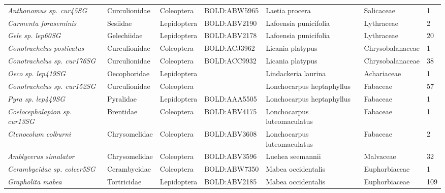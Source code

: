 \documentclass[11pt]{article}
\begin{document}
\begin{landscape}
\begin{longtable}{@{}lllllll@{}}
\textit{Anthonomus sp. cur45SG}                       & Curculionidae   & Coleoptera   & BOLD:ABW5965 & Laetia procera                     & Salicaceae       & 1     \\
\textit{Carmenta foraseminis}                         & Sesiidae        & Lepidoptera  & BOLD:ABV2190 & Lafoensia punicifolia              & Lythraceae       & 2     \\
\textit{Gele sp. lep60SG}                             & Gelechiidae     & Lepidoptera  & BOLD:ABV2178 & Lafoensia punicifolia              & Lythraceae       & 20    \\
\textit{Conotrachelus posticatus}                     & Curculionidae   & Coleoptera   & BOLD:ACJ3962 & Licania platypus                   & Chrysobalanaceae & 1     \\
\textit{Conotrachelus sp. cur176SG}                   & Curculionidae   & Coleoptera   & BOLD:ACC9932 & Licania platypus                   & Chrysobalanaceae & 38    \\
\textit{Oeco sp. lep419SG}                            & Oecophoridae    & Lepidoptera  &              & Lindackeria laurina                & Achariaceae      & 1     \\
\textit{Conotrachelus sp. cur152SG}                   & Curculionidae   & Coleoptera   &              & Lonchocarpus heptaphyllus          & Fabaceae         & 57    \\
\textit{Pyra sp. lep449SG}                            & Pyralidae       & Lepidoptera  & BOLD:AAA5505 & Lonchocarpus heptaphyllus          & Fabaceae         & 1     \\
\textit{Coelocephalapion sp. cur13SG}                 & Brentidae       & Coleoptera   & BOLD:ABV4175 & Lonchocarpus luteomaculatus        & Fabaceae         & 1     \\
\textit{Ctenocolum colburni}                          & Chrysomelidae   & Coleoptera   & BOLD:ABV3608 & Lonchocarpus luteomaculatus        & Fabaceae         & 2     \\
\textit{Amblycerus simulator}                         & Chrysomelidae   & Coleoptera   & BOLD:ABV3596 & Luehea seemannii                   & Malvaceae        & 32    \\
\textit{Cerambycidae sp. colcer5SG}                   & Cerambycidae    & Coleoptera   & BOLD:ABW7350 & Mabea occidentalis                 & Euphorbiaceae    & 1     \\
\textit{Grapholita mabea}                             & Tortricidae     & Lepidoptera  & BOLD:ABV2185 & Mabea occidentalis                 & Euphorbiaceae    & 109   \\

\end{longtable}
\end{landscape}
\end{document}
